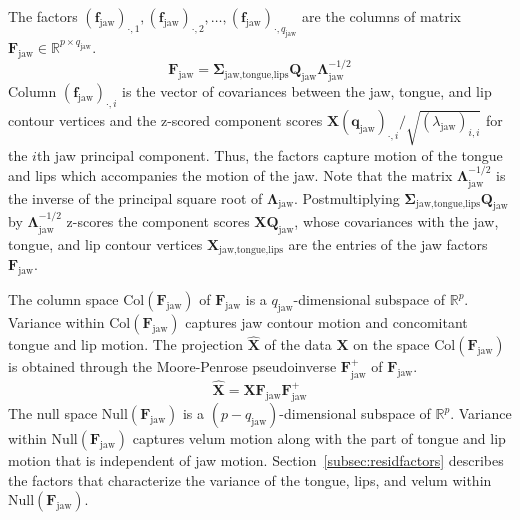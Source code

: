 \documentclass[preprint]{JASAnew}\usepackage[]{graphicx}\usepackage[]{color}
\begin{document}
% 
The factors $(\mathbf{f}_\text{jaw})_{\cdot,1},(\mathbf{f}_\text{jaw})_{\cdot,2},\ldots,(\mathbf{f}_\text{jaw})_{\cdot,q_\text{jaw}}$ are the columns of matrix $\mathbf{F}_\text{jaw} \in \mathbb{R}^{p\times q_\text{jaw}}$. 
%
\begin{equation}
\mathbf{F}_\text{jaw}
 = \boldsymbol{\Sigma}_\text{jaw,tongue,lips} \mathbf{Q}_\text{jaw} \boldsymbol{\Lambda}_\text{jaw}^{-1/2}
\end{equation}
%
Column $(\mathbf{f}_\text{jaw})_{\cdot,i}$ is the vector of covariances between the jaw, tongue, and lip contour vertices and the z-scored component scores $\mathbf{X} (\mathbf{q}_\text{jaw})_{\cdot,i} / \sqrt{(\lambda_\text{jaw})_{i,i}}$ for the $i$th jaw principal component. 
%
Thus, the factors capture motion of the tongue and lips which accompanies the motion of the jaw. 
%
Note that the matrix $\boldsymbol{\Lambda}_\text{jaw}^{-1/2}$ is the inverse of the principal square root of $\boldsymbol{\Lambda}_\text{jaw}$.
%
Postmultiplying $\boldsymbol{\Sigma}_\text{jaw,tongue,lips} \mathbf{Q}_\text{jaw}$ by $\boldsymbol{\Lambda}_\text{jaw}^{-1/2}$ z-scores the component scores $\mathbf{X}\mathbf{Q}_\text{jaw}$, whose covariances with the jaw, tongue, and lip contour vertices $\mathbf{X}_\text{jaw,tongue,lips}$ are the entries of the jaw factors $\mathbf{F}_\text{jaw}$.

The column space $\mathrm{Col}(\mathbf{F}_\text{jaw})$ of $\mathbf{F}_\text{jaw}$ is a $q_\text{jaw}$-dimensional subspace of $\mathbb{R}^p$. 
%
Variance within $\mathrm{Col}(\mathbf{F}_\text{jaw})$ captures jaw contour motion and concomitant tongue and lip motion. 
%
The projection $\mathbf{\hat{X}}$ of the data $\mathbf{X}$ on the space $\mathrm{Col}(\mathbf{F}_\text{jaw})$ is obtained through the Moore-Penrose pseudoinverse $\mathbf{F}_\text{jaw}^+$ of $\mathbf{F}_\text{jaw}$. 
%
\begin{equation} \label{eq:XXuu}
\mathbf{\hat{X}} 
= \mathbf{X} 
  \mathbf{F}_\text{jaw}
  \mathbf{F}_\text{jaw}^+ 
\end{equation}
%
The null space $\mathrm{Null}(\mathbf{F}_\text{jaw})$ is a $(p-q_\text{jaw})$-dimensional subspace of $\mathbb{R}^p$. 
% 
Variance within $\mathrm{Null}(\mathbf{F}_\text{jaw})$ captures velum motion along with the part of tongue and lip motion that is independent of jaw motion. 
%
Section~\ref{subsec:residfactors} describes the factors that characterize the variance of the tongue, lips, and velum within $\mathrm{Null} \left( \mathbf{F}_\text{jaw} \right)$. 
\end{document}
